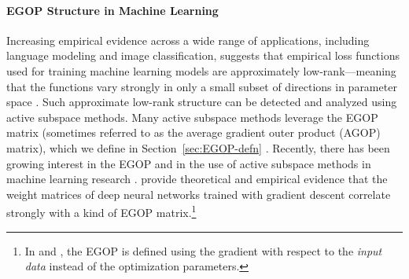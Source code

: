 \paragraph{EGOP Structure in Machine Learning}
    Increasing empirical evidence across a wide range of applications, including language modeling and image classification, suggests that empirical loss functions used for training machine learning models are approximately low-rank---meaning that the functions vary strongly in only a small subset of directions in parameter space \citet{papyan2018full,sagun2017empirical,  zhang2024transformers}. Such approximate low-rank structure can be detected and analyzed using active subspace methods. Many active subspace methods leverage the EGOP matrix (sometimes referred to as the average gradient outer product (AGOP) matrix), which we define in Section~\ref{sec:EGOP-defn}  \cite{constantine2015active}. Recently, there has been growing interest in the EGOP and in the use of active subspace methods in machine learning research \cite{cui2020active, mallinar2024emergence,radhakrishnan2022mechanism,zhu2023catapults}. \citet{radhakrishnan2022mechanism} provide theoretical and empirical evidence that the weight matrices of deep neural networks trained with gradient descent correlate strongly with a kind of EGOP matrix.\footnote{In \citet{mallinar2024emergence,radhakrishnan2022mechanism} and \citet{zhu2023catapults}, the EGOP is defined using the gradient with respect to the \emph{input data} instead of the optimization parameters.}